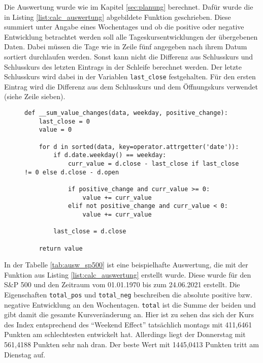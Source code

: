 Die Auswertung wurde wie im Kapitel \cref{sec:planung} berechnet. Dafür wurde die in Listing \ref{list:calc_auswertung} abgebildete Funktion geschrieben. Diese summiert unter Angabe eines Wochentages und ob die positive oder negative Entwicklung betrachtet werden soll alle Tageskursentwicklungen der übergebenen Daten. Dabei müssen die Tage wie in Zeile fünf angegeben nach ihrem Datum sortiert durchlaufen werden. Sonst kann nicht die Differenz aus Schlusskurs und Schlusskurs des letzten Eintrags in der Schleife berechnet werden. Der letzte Schlusskurs wird dabei in der Variablen \texttt{last\_close} festgehalten. Für den ersten Eintrag wird die Differenz aus dem Schlusskurs und dem Öffnungskurs verwendet (siehe Zeile sieben).

\begin{figure}[!htb]
    \begin{lstlisting}[caption=Berechnung der Kursentwicklung nach Wochentag, label=list:calc_auswertung]
def __sum_value_changes(data, weekday, positive_change):
    last_close = 0
    value = 0

    for d in sorted(data, key=operator.attrgetter('date')):
        if d.date.weekday() == weekday:
            curr_value = d.close - last_close if last_close != 0 else d.close - d.open

            if positive_change and curr_value >= 0:
                value += curr_value
            elif not positive_change and curr_value < 0:
                value += curr_value

        last_close = d.close

    return value
    \end{lstlisting}
\end{figure}

In der Tabelle \ref{tab:ausw_sp500} ist eine beispielhafte Auswertung, die mit der Funktion aus Listing \ref{list:calc_auswertung} erstellt wurde. Diese wurde für den S\&P 500 und den Zeitraum vom 01.01.1970 bis zum 24.06.2021 erstellt. Die Eigenschaften \texttt{total\_pos} und \texttt{total\_neg} beschreiben die absolute positive bzw. negative Entwicklung an den Wochentagen. \texttt{total} ist die Summe der beiden und gibt damit die gesamte Kursveränderung an. Hier ist zu sehen das sich der Kurs des Index entsprechend des \enquote{Weekend Effect} tatsächlich montags mit 411,6461 Punkten am schlechtesten entwickelt hat. Allerdings liegt der Donnerstag mit 561,4188 Punkten sehr nah dran. Der beste Wert mit 1445,0413 Punkten tritt am Dienstag auf.

